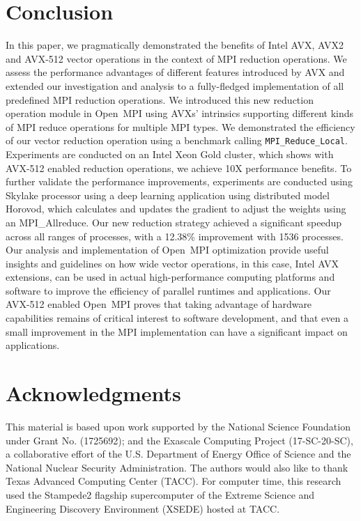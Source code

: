 \documentclass[5p,times,twocolumn]{elsarticle}
\newcommand{\mpifunc}[1]{\lstinline"MPI_#1"\xspace}
\newcommand{\ompi}[0]{Open~MPI\xspace}
\newcommand{\mpi}[0]{\textsc{MPI}\xspace}
\begin{document}
\section{Conclusion}\label{sec:conclusion}
In this paper, we pragmatically demonstrated the benefits of Intel
AVX, AVX2 and AVX-512 vector operations in the context of MPI reduction
operations. We assess the performance advantages of different features
introduced by AVX and extended our investigation and analysis to a
fully-fledged implementation of all predefined MPI reduction
operations.
%
We introduced this new reduction operation module in \ompi using AVXs'
intrinsics supporting different kinds of \mpi reduce operations for
multiple \mpi types. We demonstrated the efficiency of our vector
reduction operation using a benchmark calling
\mpifunc{Reduce_Local}. Experiments are conducted on an Intel Xeon
Gold cluster, which shows with AVX-512 enabled reduction operations, we
achieve 10X performance benefits.
%
To further validate the performance improvements, experiments are
conducted using Skylake processor using a deep learning application
using distributed model Horovod, which calculates and updates the
gradient to adjust the weights using an MPI\_Allreduce.  Our new
reduction strategy achieved a significant speedup across all ranges of
processes, with a 12.38\% improvement with 1536 processes.  Our
analysis and implementation of \ompi optimization provide useful
insights and guidelines on how wide vector operations, in this case,
Intel AVX extensions, can be used in actual high-performance computing
platforms and software to improve the efficiency of parallel runtimes
and applications.
%
Our AVX-512 enabled \ompi proves that taking advantage of hardware
capabilities remains of critical interest to software development, and
that even a small improvement in the MPI implementation can have
a significant impact on applications.

\section*{Acknowledgments}
%
This material is based upon work supported by the National Science Foundation under Grant No. (1725692); and the Exascale Computing Project (17-SC-20-SC), a collaborative effort of the
U.S. Department of Energy Office of Science and the National Nuclear Security Administration.
The authors would also like to thank
Texas Advanced Computing Center (TACC). For computer time, this research used
the Stampede2 flagship supercomputer of the Extreme Science and Engineering Discovery Environment (XSEDE) hosted at TACC.

\balance

%
%


\end{document}
